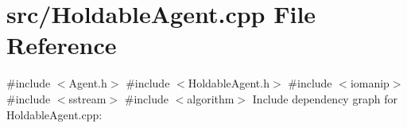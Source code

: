 \section{src/\+Holdable\+Agent.cpp File Reference}
\label{_holdable_agent_8cpp}
{\ttfamily \#include $<$Agent.\+h$>$}\newline
{\ttfamily \#include $<$Holdable\+Agent.\+h$>$}\newline
{\ttfamily \#include $<$iomanip$>$}\newline
{\ttfamily \#include $<$sstream$>$}\newline
{\ttfamily \#include $<$algorithm$>$}\newline
Include dependency graph for Holdable\+Agent.\+cpp\+:
